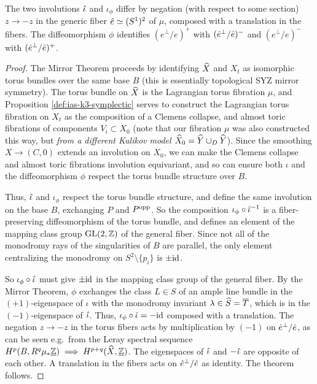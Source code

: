\documentclass{amsart}
\begin{document}
\begin{theorem}\label{thm:mirror-and-involution}
  The two involutions $\hat \iota$ and $\iota_\phi$
  differ by negation (with respect to some section)
  $z\to -z$ in the
  generic fiber $\hat e\simeq (S^1)^2$ of $\mu$, composed with a
  translation in the fibers. The diffeomorphism $\phi$ identifies
  $(e^\perp/e)^+$ with $(\hat e^\perp/\hat e)^-$ and $(e^\perp/e)^-$ with
  $(\hat e^\perp/\hat e)^+$.
\end{theorem}
\begin{proof}
The Mirror Theorem \cite[Prop.~3.14]{engel2021smoothings} proceeds
by identifying ${\widehat X}$ and $X_t$ as isomorphic torus bundles over the same base $B$
(this is essentially topological SYZ mirror symmetry). The torus bundle on ${\widehat X}$
is the Lagrangian torus fibration $\mu$, and Proposition \ref{def:ias-k3-symplectic}
serves to construct the Lagrangian torus fibration on $X_t$ as the composition
of a Clemens collapse, and almost toric fibrations of components $V_i\subset X_0$
(note that our fibration $\mu$ was also constructed this way, but {\it from a different
Kulikov model ${\widehat X}_0 = {\widehat Y}\cup_D {\widehat Y}$}). Since the smoothing
$X\to (C,0)$ extends an involution on $X_0$, we can make the Clemens collapse
and almost toric fibrations involution equivariant, and so can ensure both $\iota$ and
the diffeomorphism $\phi$ respect the torus bundle structure over $B$. 

  Thus, $\hat \iota$ and $\iota_\phi$ respect the torus bundle structure,
  and define the same
  involution on the base $B$, exchanging $P$ and $P^{\rm opp}$. So the composition
  $\iota_\phi \circ\hat \iota^{-1}$ is a fiber-preserving diffeomorphism of the
  torus bundle, and defines an
  element of the mapping class group $\operatorname{GL}(2,{\mathbb Z})$
  of the general fiber.
  Since not all of the monodromy rays of the singularities of $B$ are
  parallel, the only element centralizing the monodromy
  on $S^2\setminus\{p_i\}$ is $\pm{\rm id}$.
  
  So $\iota_\phi\circ\hat \iota$ must give $\pm{\rm id}$ in the mapping class group
  of the general fiber.
  By the Mirror Theorem, $\phi$ exchanges the class $L\in S$ of an ample line
  bundle in the $(+1)$-eigenspace of $\iota$ with
  the monodromy invariant $\lambda\in{\widehat S}={\overline T}$, which is in the $(-1)$-eigenspace of
  $\hat \iota$. Thus, $\iota_\phi\circ\hat \iota=-{\rm id}$ composed with a
  translation. The negation $z\to -z$ in the torus fibers acts by
  multiplication by $(-1)$ on $\hat e^\perp/\hat e$, as can be
  seen e.g.~from the Leray spectral sequence 
  $H^p(B, R^q\mu_*\underline{{\mathbb Z}}) \implies H^{p+q}({\widehat X},
  \underline{{\mathbb Z}})$. The eigenspaces of $\hat \iota$ and $-\hat \iota$ are
  opposite of each other. A translation in the fibers acts on
  $\hat e^\perp/\hat e$ as identity. The theorem follows. 
\end{proof}
\end{document}
